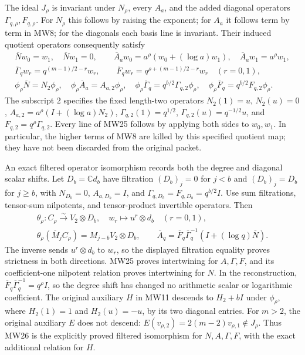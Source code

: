 The ideal \(J_\rho\) is invariant under \(N_\rho\), every \(A_a\),
and the added diagonal operators \(\Gamma_{q,\rho},F_{q,\rho}\).
For \(N_\rho\) this follows by raising the exponent; for \(A_a\)
it follows term by term in MW8; for the diagonals each basis line
is invariant. Their induced quotient operators consequently satisfy
\[
 \begin{gathered}
 \overline Nw_0=w_1,\quad \overline Nw_1=0,\qquad
 \overline A_aw_0=a^\rho(w_0+(\log a)w_1),\quad
 \overline A_aw_1=a^\rho w_1,\\
 \overline\Gamma_qw_r=q^{(m-1)/2-r}w_r,\qquad
 \overline F_qw_r=q^{\rho+(m-1)/2-r}w_r\quad(r=0,1),\\
 \phi_\rho\overline N=N_2\phi_\rho,\quad
 \phi_\rho\overline A_a=A_{a,2}\phi_\rho,\quad
 \phi_\rho\overline\Gamma_q=q^{b/2}\Gamma_{q,2}\phi_\rho,\quad
 \phi_\rho\overline F_q=q^{b/2}F_{q,2}\phi_\rho.
 \end{gathered}
 \tag{MW25}
\]
The subscript \(2\) specifies the fixed length-two operators
\(N_2(1)=u\), \(N_2(u)=0\),
\(A_{a,2}=a^\rho(I+(\log a)N_2)\),
\(\Gamma_{q,2}(1)=q^{1/2}\), \(\Gamma_{q,2}(u)=q^{-1/2}u\),
and \(F_{q,2}=q^\rho\Gamma_{q,2}\). Every line of MW25 follows by
applying both sides to \(w_0,w_1\). In particular, the higher
terms of MW8 are killed by this specified quotient map; they have
not been discarded from the original packet.

An exact filtered operator isomorphism records both the degree and
diagonal scalar shifts. Let \(D_b=\mathbb C d_b\) have filtration
\((D_b)_j=0\) for \(j<b\) and \((D_b)_j=D_b\) for \(j\geq b\),
with \(N_{D_b}=0\), \(A_{a,D_b}=I\), and
\(\Gamma_{q,D_b}=F_{q,D_b}=q^{b/2}I\). Use sum filtrations,
tensor-sum nilpotents, and tensor-product invertible operators. Then
\[
 \begin{gathered}
 \theta_\rho:C_\rho\xrightarrow{\sim}V_2\otimes D_b,
 \quad w_r\longmapsto u^r\otimes d_b\quad(r=0,1),\\
 \theta_\rho(\overline M_jC_\rho)
        =M_{j-b}V_2\otimes D_b,\qquad
 \overline A_q=\overline F_q\overline\Gamma_q^{-1}
                              (I+(\log q)\overline N).
 \end{gathered}
 \tag{MW26}
\]
The inverse sends \(u^r\otimes d_b\) to \(w_r\), so the displayed
filtration equality proves strictness in both directions. MW25
proves intertwining for \(A,\Gamma,F\), and its coefficient-one
nilpotent relation proves intertwining for \(N\). In the reconstruction,
\(\overline F_q\overline\Gamma_q^{-1}=q^\rho I\), so the
degree shift has changed no arithmetic scalar or logarithmic
coefficient. The original auxiliary \(H\) in MW11 descends to
\(H_2+bI\) under \(\phi_\rho\), where \(H_2(1)=1\) and \(H_2(u)=-u\),
by its two diagonal entries.
For \(m>2\), the original auxiliary \(E\) does not descend:
\(E(v_{\rho,2})=2(m-2)v_{\rho,1}\notin J_\rho\).
Thus MW26 is the explicitly proved filtered isomorphism for
\(N,A,\Gamma,F\), with the exact additional relation for \(H\).

